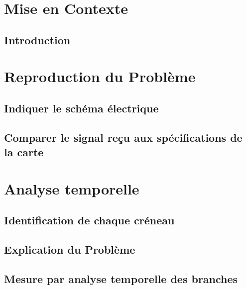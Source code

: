 \documentclass[DIV=15,paper=letter,titlepage=true,fontsize=12pt,headings=normal,captions=nooneline]{scrartcl}
\begin{document}

\newpage
\renewcommand*\contentsname{Table des Matières}
\tableofcontents
\newpage

\setcounter{page}{0}

 \section{Mise en Contexte} %
 \subsection{Introduction}
 
 \FloatBarrier

\section{Reproduction du Problème}
\subsection{Indiquer le schéma électrique}

\FloatBarrier
\subsection{Comparer le signal reçu aux spécifications de la carte}

\FloatBarrier

\section{Analyse temporelle}
\subsection{Identification de chaque créneau}

\FloatBarrier
\subsection{Explication du Problème}

\FloatBarrier
\subsection{Mesure par analyse temporelle des branches}

\FloatBarrier
\end{document}
